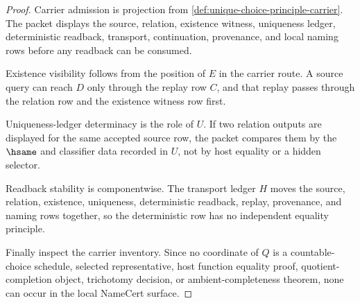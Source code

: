\begin{proof}
Carrier admission is projection from \autoref{def:unique-choice-principle-carrier}. The packet displays the source, relation, existence witness, uniqueness ledger, deterministic readback, transport, continuation, provenance, and local naming rows before any readback can be consumed.

Existence visibility follows from the position of $E$ in the carrier route. A source query can reach $D$ only through the replay row $C$, and that replay passes through the relation row and the existence witness row first.

Uniqueness-ledger determinacy is the role of $U$. If two relation outputs are displayed for the same accepted source row, the packet compares them by the $\hsame$ and classifier data recorded in $U$, not by host equality or a hidden selector.

Readback stability is componentwise. The transport ledger $H$ moves the source, relation, existence, uniqueness, deterministic readback, replay, provenance, and naming rows together, so the deterministic row has no independent equality principle.

Finally inspect the carrier inventory. Since no coordinate of $Q$ is a countable-choice schedule, selected representative, host function equality proof, quotient-completion object, trichotomy decision, or ambient-completeness theorem, none can occur in the local NameCert surface.
\end{proof}

